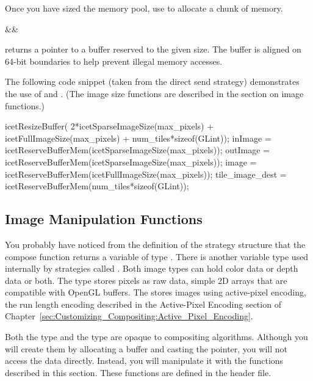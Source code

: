 \label{manpage:icetReserveBufferMem}
Once you have sized the memory pool, use  to
allocate a chunk of memory.

\begin{Table}{3}
  \textC{(}&&\quad\textC{);}
\end{Table}

 returns a pointer to a buffer reserved to the
given size.  The buffer is aligned on 64-bit boundaries to help prevent
illegal memory accesses.

The following code snippet (taken from the direct send strategy)
demonstrates the use of  and
.  (The image size functions are described in
the section on image functions.)

\begin{code}
    icetResizeBuffer(  2*icetSparseImageSize(max_pixels)
                     + icetFullImageSize(max_pixels)
                     + num_tiles*sizeof(GLint));
    inImage     = icetReserveBufferMem(icetSparseImageSize(max_pixels));
    outImage    = icetReserveBufferMem(icetSparseImageSize(max_pixels));
    image       = icetReserveBufferMem(icetFullImageSize(max_pixels));
    tile_image_dest = icetReserveBufferMem(num_tiles*sizeof(GLint));
\end{code}

\subsection{Image Manipulation Functions}

You probably have noticed from the definition of the strategy structure
that the compose function returns a variable of type .
There is another variable type used internally by strategies called
.  Both image types can hold color data or depth
data or both.  The  type stores pixels as raw data, simple
2D arrays that are compatible with OpenGL buffers.  The
 stores images using
active-pixel encoding, the run length encoding
described in the Active-Pixel Encoding section of
Chapter~\ref{sec:Customizing_Compositing:Active_Pixel_Encoding}.

Both the  type and the  type are
opaque to compositing algorithms.  Although you will create them by
allocating a buffer and casting the pointer, you will not access the data
directly.  Instead, you will manipulate it with the functions described in
this section.  These functions are defined in the
 header file.


